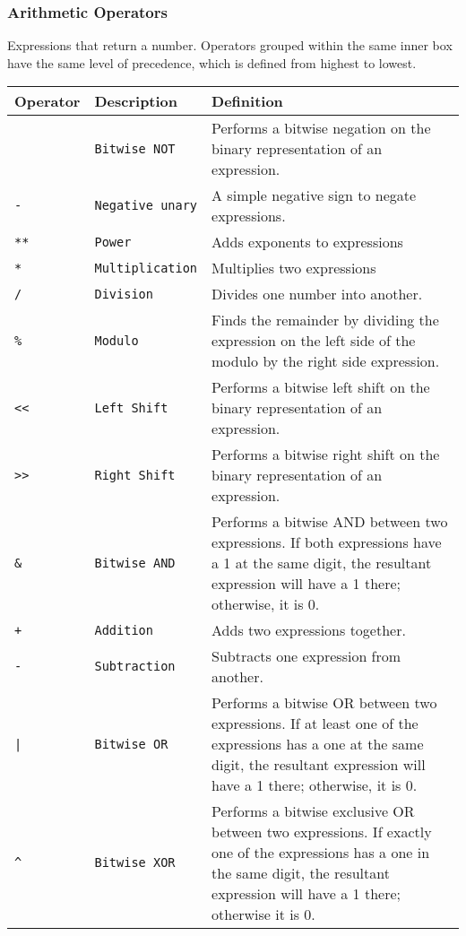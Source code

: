 		\subsubsection{Arithmetic Operators} 
			Expressions that return a number. Operators grouped within the same inner box have the same level of precedence, which is defined from highest to lowest.
			\begin{table}[H]
			\begin{tabular}{ |p{2cm}|p{3cm}|p{8cm}|  }
			\hline
			\textbf{Operator} & \textbf{Description} & \textbf{Definition} \\ \hline
			\texttt{~} & \texttt{Bitwise NOT } & {Performs a bitwise negation on the binary representation of an expression.} \\
			\texttt{-} & \texttt{Negative unary} & {A simple negative sign to negate expressions.} \\ \hline
			\texttt{**} & \texttt{Power} & {Adds exponents to expressions} \\ \hline
			\texttt{*} & \texttt{Multiplication} & {Multiplies two expressions} \\
			\texttt{/} & \texttt{Division} & {Divides one number into another}. \\
			\texttt{\%} & \texttt{Modulo} & {Finds the remainder by dividing the expression on the left side of the modulo by the right side expression.} \\
			\texttt{<<} & \texttt{Left Shift} & {Performs a bitwise left shift on the binary representation of an expression.} \\
			\texttt{>>} & \texttt{Right Shift} & {Performs a bitwise right shift on the binary representation of an expression.} \\
			\texttt{\&} & \texttt{Bitwise AND} & {Performs a bitwise AND between two expressions. If both expressions have a 1 at the same digit, the resultant expression will have a 1 there; otherwise, it is 0.} \\ \hline
			\texttt{+} & \texttt{Addition} & {Adds two expressions together.} \\
			\texttt{-} & \texttt{Subtraction} & {Subtracts one expression from another.} \\
			\texttt{|} & \texttt{Bitwise OR} & {Performs a bitwise OR between two expressions. If at least one of the expressions has a one at the same digit, the resultant expression will have a 1 there; otherwise, it is 0.} \\
			\texttt{\^} & \texttt{Bitwise XOR} & {Performs a bitwise exclusive OR between two expressions. If exactly one of the expressions has a one in the same digit, the resultant expression will have a 1 there; otherwise it is 0.} \\ \hline
			\end{tabular}
			\end{table}
